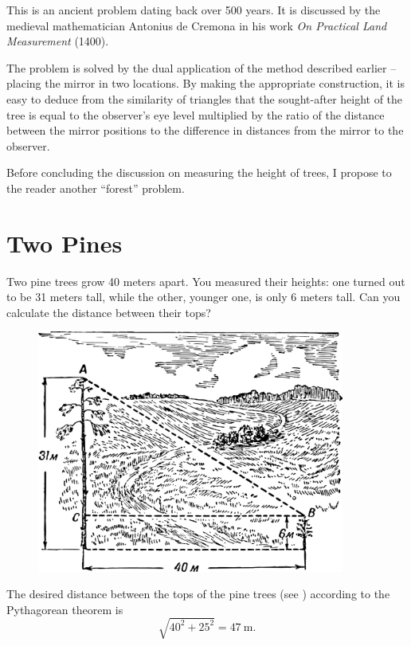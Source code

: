 \ans This is an ancient problem dating back over 500 years. It is discussed by the medieval mathematician Antonius de Cremona in his work \emph{On Practical Land Measurement} (1400).


The problem is solved by the dual application of the method described earlier -- placing the mirror in two locations. By making the appropriate construction, it is easy to deduce from the similarity of triangles that the sought-after height of the tree is equal to the observer's eye level multiplied by the ratio of the distance between the mirror positions to the difference in distances from the mirror to the observer.

Before concluding the discussion on measuring the height of trees, I propose to the reader another ``forest'' problem.

\section{Two Pines}
\label{sec-1.9}


\ques Two pine trees grow 40 meters apart. You measured their heights: one turned out to be 31 meters tall, while the other, younger one, is only 6 meters tall. Can you calculate the distance between their tops?

\begin{figure}[h!]
\centering
\includegraphics[width=0.9\textwidth]{figures/ch-01/fig-01-16.pdf}
\end{figure}

\ans The desired distance between the tops of the pine trees (see ) according to the Pythagorean theorem is
\begin{equation*}%
\sqrt{40^{2} + 25^{2}} = \SI{47}{\meter}.
\end{equation*}



